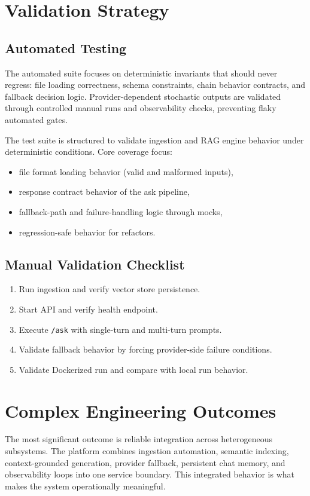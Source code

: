\documentclass[12pt,letterpaper]{report}
\begin{document}
\section{Validation Strategy}
\subsection{Automated Testing}
The automated suite focuses on deterministic invariants that should never regress: file loading correctness, schema constraints, chain behavior contracts, and fallback decision logic. Provider-dependent stochastic outputs are validated through controlled manual runs and observability checks, preventing flaky automated gates.

The test suite is structured to validate ingestion and RAG engine behavior under deterministic conditions. Core coverage focus:
\begin{itemize}
\item file format loading behavior (valid and malformed inputs),
\item response contract behavior of the ask pipeline,
\item fallback-path and failure-handling logic through mocks,
\item regression-safe behavior for refactors.
\end{itemize}

\subsection{Manual Validation Checklist}
\begin{enumerate}
\item Run ingestion and verify vector store persistence.
\item Start API and verify health endpoint.
\item Execute \texttt{/ask} with single-turn and multi-turn prompts.
\item Validate fallback behavior by forcing provider-side failure conditions.
\item Validate Dockerized run and compare with local run behavior.
\end{enumerate}

\section{Complex Engineering Outcomes}
The most significant outcome is reliable integration across heterogeneous subsystems. The platform combines ingestion automation, semantic indexing, context-grounded generation, provider fallback, persistent chat memory, and observability loops into one service boundary. This integrated behavior is what makes the system operationally meaningful.
\end{document}
